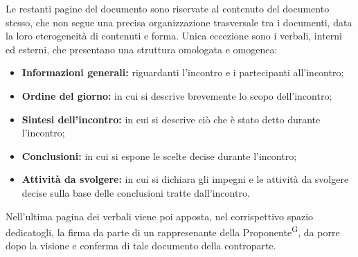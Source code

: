 \documentclass[8pt]{article}
\newcommand{\glossterm}[1]{#1\textsuperscript{G}} %
\begin{document}
Le restanti pagine del documento sono riservate al contenuto del documento stesso, che non segue una precisa organizzazione trasversale tra i documenti, data la loro eterogeneità di contenuti e forma.
Unica eccezione sono i verbali, interni ed esterni, che presentano una struttura omologata e omogenea:
\begin{itemize}
    \item \textbf{Informazioni generali:} riguardanti l'incontro e i partecipanti all'incontro;
    \item \textbf{Ordine del giorno:} in cui si descrive brevemente lo scopo dell'incontro;
    \item \textbf{Sintesi dell'incontro:} in cui si descrive ciò che è stato detto durante l'incontro;
    \item \textbf{Conclusioni:} in cui si espone le scelte decise durante l'incontro;
    \item \textbf{Attività da svolgere:} in cui si dichiara gli impegni e le attività da svolgere decise sulla base delle conclusioni tratte dall'incontro.
\end{itemize}
Nell'ultima pagina dei verbali viene poi apposta, nel corrispettivo spazio dedicatogli, la firma da parte di un rappresenante della \glossterm{Proponente}, da porre dopo la visione e conferma di tale documento della controparte.
\end{document}
